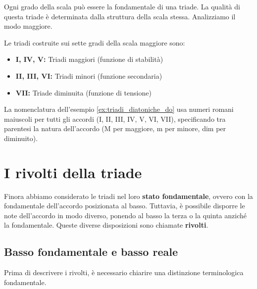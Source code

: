 Ogni grado della scala può essere la fondamentale di una triade. La qualità di questa triade è determinata dalla struttura della scala stessa. Analizziamo il modo maggiore.

\begin{definizione}
	\label{def:triadi_diatoniche_maggiore}
	Le triadi costruite sui sette gradi della scala maggiore sono:
	\begin{itemize}
		\item \textbf{I, IV, V:} Triadi maggiori (funzione di stabilità)
		\item \textbf{II, III, VI:} Triadi minori (funzione secondaria)
		\item \textbf{VII:} Triade diminuita (funzione di tensione)
	\end{itemize}
\end{definizione}

\begin{esempio}
	\label{ex:triadi_diatoniche_do}
\end{esempio}

La nomenclatura dell'esempio \ref{ex:triadi_diatoniche_do} usa numeri romani maiuscoli per tutti gli accordi (I, II, III, IV, V, VI, VII), specificando tra parentesi la natura dell'accordo (M per maggiore, m per minore, dim per diminuito).

\section{I rivolti della triade}
\label{sec:rivolti_triade}

Finora abbiamo considerato le triadi nel loro \textbf{stato fondamentale}, ovvero con la fondamentale dell'accordo posizionata al basso. Tuttavia, è possibile disporre le note dell'accordo in modo diverso, ponendo al basso la terza o la quinta anziché la fondamentale. Queste diverse disposizioni sono chiamate \textbf{rivolti}.

\subsection{Basso fondamentale e basso reale}
\label{subsec:basso_fondamentale_reale}

Prima di descrivere i rivolti, è necessario chiarire una distinzione terminologica fondamentale.

